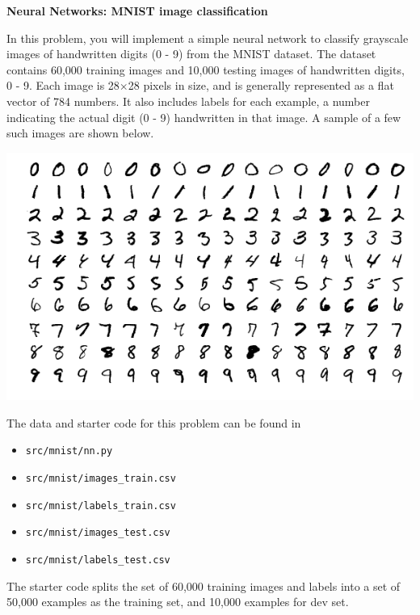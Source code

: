 \item {} {\bf Neural Networks: MNIST image classification}


In this problem, you will implement a simple neural network
to classify grayscale images of handwritten digits (0 - 9) from
the MNIST dataset. The dataset contains 60,000 training images and
10,000 testing images of handwritten digits, 0 - 9. Each image is
28$\times$28 pixels in size, and is generally represented as a flat
vector of 784 numbers. It also includes labels for each example, a number
indicating the actual digit (0 - 9) handwritten in that image. A sample of
a few such images are shown below.

\begin{center}
\includegraphics[scale=0.5]{mnist/mnist_plot}
\end{center}


The data and starter code for this problem can be found in

\begin{itemize}
\item \texttt{src/mnist/nn.py}
\item \texttt{src/mnist/images\_train.csv}
\item \texttt{src/mnist/labels\_train.csv}
\item \texttt{src/mnist/images\_test.csv}
\item \texttt{src/mnist/labels\_test.csv}
\end{itemize}

The starter code splits the set
of 60,000 training images and labels into a set of 50,000 examples as
the training set, and 10,000 examples for dev set.

